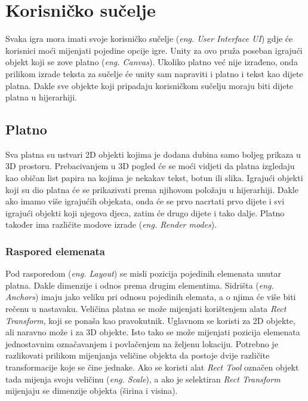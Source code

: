 \section{Korisničko sučelje}
Svaka igra mora imati svoje korisničko sučelje (\emph{eng. User Interface UI}) gdje će korisnici moći mijenjati pojedine opcije igre. Unity za ovo pruža poseban igrajući objekt koji se zove platno (\emph{eng. Canvas}). Ukoliko platno već nije izrađeno, onda prilikom izrade teksta za sučelje će unity sam napraviti i platno i tekst kao dijete platna. Dakle sve objekte koji pripadaju korisničkom sučelju moraju biti dijete platna u hijerarhiji.
\subsection{Platno}
Sva platna su ustvari 2D objekti kojima je dodana dubina samo boljeg prikaza u 3D prostoru. Prebacivanjem u 3D pogled će se moći vidjeti da platna izgledaju kao običan list papira na kojima je nekakav tekst, botun ili slika. Igrajući objekti koji su dio platna će se prikazivati prema njihovom položaju u hijerarhiji. Dakle ako imamo više igrajućih objekata, onda će se prvo nacrtati prvo dijete i svi igrajući objekti koji njegova djeca, zatim će drugo dijete i tako dalje. Platno također ima različite modove izrade (\emph{eng. Render modes}).
\subsubsection{Raspored elemenata}
Pod rasporedom (\emph{eng. Layout}) se misli pozicija pojedinih elemenata unutar platna. Dakle dimenzije i odnos prema drugim elementima. Sidrišta (\emph{eng. Anchors}) imaju jako veliku pri odnosu pojedinih elemata, a o njima će više biti rečenu u nastavaku. Veličina platna se može mijenjati korištenjem alata \emph{Rect Transform}, koji se ponaša kao pravokutnik. Uglavnom se koristi za 2D objekte, ali naravno može i za 3D objekte. Isto tako se može mijenjati pozicija elemenata jednostavnim označavanjem i povlačenjem na željenu lokaciju. Potrebno je razlikovati prilikom mijenjanja veličine objekta da postoje dvije različite transformacije koje se čine jednake. Ako se koristi alat \emph{Rect Tool} označen objekt tada mijenja svoju veličinu (\emph{eng. Scale}), a ako je selektiran \emph{Rect Transform} mijenjaju se dimenzije objekta (širina i visina). 
\newpage
